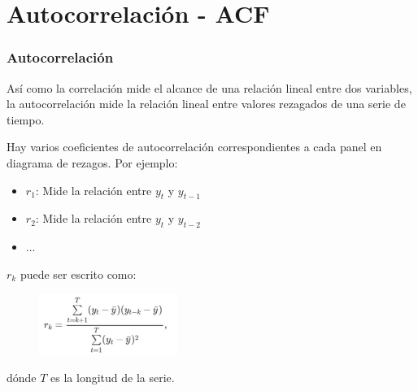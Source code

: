 \documentclass[10pt]{beamer}
\begin{document}



\section{Autocorrelación - ACF}
\begin{frame}[fragile]
\frametitle{Autocorrelación}


Así como la correlación mide el alcance de una relación lineal entre dos variables, la autocorrelación mide la relación lineal entre valores rezagados de una serie de tiempo.

\vspace{4mm}

Hay varios coeficientes de autocorrelación correspondientes a cada panel en diagrama de rezagos. Por ejemplo:

\begin{itemize}
\item $r_1$: Mide la relación entre $y_t$ y $y_{t-1}$
\item $r_2$: Mide la relación entre $y_t$ y $y_{t-2}$
\item ...
\end{itemize}

$r_k$ puede ser escrito como:

\begin{figure}
\begin{center}
    \includegraphics[width=0.4\textwidth]{Imagen27.JPG}
\end{center}
\end{figure}

dónde $T$ es la longitud de la serie.

\end{frame}


\end{document}
